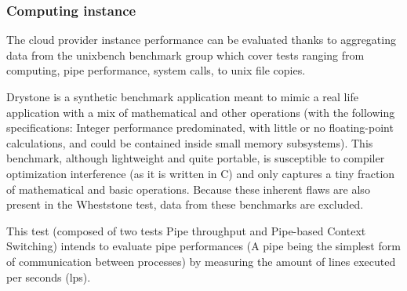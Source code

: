 \documentclass[11pt]{article}
\begin{document}
\subsubsection{Computing instance}
\hspace{5mm} The cloud provider instance performance can be evaluated thanks to aggregating data from the unixbench benchmark group which cover tests ranging from computing, pipe performance, system calls, to unix file copies.


\vspace{-5mm} Drystone is a synthetic benchmark application meant to mimic a real life application with a mix of mathematical and other operations (with the following specifications: Integer performance predominated, with little or no floating-point calculations, and could be contained inside small memory subsystems). This benchmark, although lightweight and quite portable, is susceptible to compiler optimization interference (as it is written in C) and only captures a tiny fraction of mathematical and basic operations. Because these inherent flaws are also present in the Wheststone test, data from these benchmarks are excluded.


\vspace{-5mm} This test (composed of two tests Pipe throughput and Pipe-based Context Switching) intends to evaluate pipe performances (A pipe being the simplest form of communication between processes) by measuring the amount of lines executed per seconds (lps).
\end{document}
